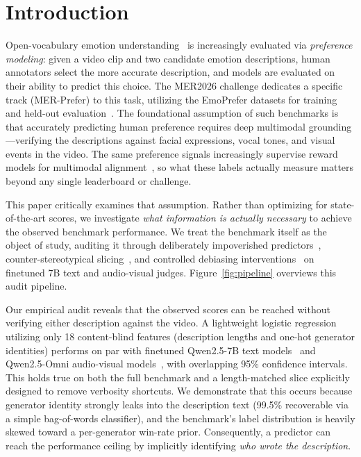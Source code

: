 \documentclass[sigconf,screen]{acmart}
\begin{document}
\section{Introduction}
Open-vocabulary emotion understanding~\cite{lian2025affectgpt,lian2024mer} is increasingly evaluated via \emph{preference modeling}: given a video clip and two candidate emotion descriptions, human annotators select the more accurate description, and models are evaluated on their ability to predict this choice. The MER2026 challenge dedicates a specific track (MER-Prefer) to this task, utilizing the EmoPrefer datasets for training and held-out evaluation~\cite{lian2026mer}. The foundational assumption of such benchmarks is that accurately predicting human preference requires deep multimodal grounding---verifying the descriptions against facial expressions, vocal tones, and visual events in the video. The same preference signals increasingly supervise reward models for multimodal alignment~\cite{ouyang2022training,rafailov2023direct}, so what these labels actually measure matters beyond any single leaderboard or challenge.

This paper critically examines that assumption. Rather than optimizing for state-of-the-art scores, we investigate \emph{what information is actually necessary} to achieve the observed benchmark performance. We treat the benchmark itself as the object of study, auditing it through deliberately impoverished predictors~\cite{gururangan2018annotation,poliak2018hypothesis}, counter-stereotypical slicing~\cite{gardner2020evaluating}, and controlled debiasing interventions~\cite{chen2024odin} on finetuned 7B text and audio-visual judges. Figure~\ref{fig:pipeline} overviews this audit pipeline.

Our empirical audit reveals that the observed scores can be reached without verifying either description against the video. A lightweight logistic regression utilizing only 18 content-blind features (description lengths and one-hot generator identities) performs on par with finetuned Qwen2.5-7B text models~\cite{qwen2025qwen25technicalreport} and Qwen2.5-Omni audio-visual models~\cite{xu2025qwen25omni}, with overlapping 95\% confidence intervals. This holds true on both the full benchmark and a length-matched slice explicitly designed to remove verbosity shortcuts. We demonstrate that this occurs because generator identity strongly leaks into the description text (99.5\% recoverable via a simple bag-of-words classifier), and the benchmark's label distribution is heavily skewed toward a per-generator win-rate prior. Consequently, a predictor can reach the performance ceiling by implicitly identifying \emph{who wrote the description}.
\end{document}

